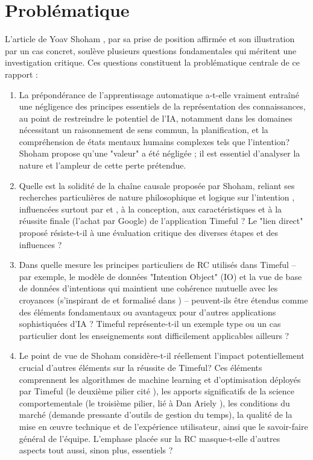\documentclass[11pt,a4paper]{article}
\begin{document}
\section{Problématique}
\label{sec:problematique}
L'article de Yoav Shoham \citep{Shoham2015Why}, par sa prise de position affirmée et son illustration par un cas concret, soulève plusieurs questions fondamentales qui méritent une investigation critique. Ces questions constituent la problématique centrale de ce rapport :

\begin{enumerate}
   \item La prépondérance de l'apprentissage automatique a-t-elle vraiment entraîné une négligence des principes essentiels de la représentation des connaissances, au point de restreindre le potentiel de l'IA, notamment dans les domaines nécessitant un raisonnement de sens commun, la planification, et la compréhension de états mentaux humains complexes tels que l'intention? Shoham propose qu'une "valeur" a été négligée \citep{Shoham2015Why} ; il est essentiel d'analyser la nature et l'ampleur de cette perte prétendue. 

    \item Quelle est la solidité de la chaîne causale proposée par Shoham, reliant ses recherches particulières de nature philosophique et logique sur l'intention \citep{Shoham2009Logics}, influencées surtout par \citet{Cohen1990Intention} et \citet{Bratman1991Intentions}, à la conception, aux caractéristiques et à la réussite finale (l'achat par Google) de l'application Timeful ? Le "lien direct" \citep{Shoham2015Why} proposé résiste-t-il à une évaluation critique des diverses étapes et des influences ? 

    \item Dans quelle mesure les principes particuliers de RC utilisés dans Timeful – par exemple, le modèle de données "Intention Object" (IO) et la vue de base de données d'intentions qui maintient une cohérence mutuelle avec les croyances (s'inspirant de \citet{AlchourronGardenforsMakinson1985} et formalisé dans \citet{Icard2023Joint}) – peuvent-ils être étendus comme des éléments fondamentaux ou avantageux pour d'autres applications sophistiquées d'IA ? Timeful représente-t-il un exemple type ou un cas particulier dont les enseignements sont difficilement applicables ailleurs ? 

    \item Le point de vue de Shoham considère-t-il réellement l'impact potentiellement crucial d'autres éléments sur la réussite de Timeful? Ces éléments comprennent les algorithmes de machine learning et d'optimisation déployés par Timeful (le deuxième pilier cité \citep{Shoham2015Why}), les apports significatifs de la science comportementale (le troisième pilier, lié à Dan Ariely \citep{Shoham2015Why}), les conditions du marché (demande pressante d'outils de gestion du temps), la qualité de la mise en œuvre technique et de l'expérience utilisateur, ainsi que le savoir-faire général de l'équipe. L'emphase placée sur la RC masque-t-elle d'autres aspects tout aussi, sinon plus, essentiels ? 


\end{enumerate}
\end{document}
